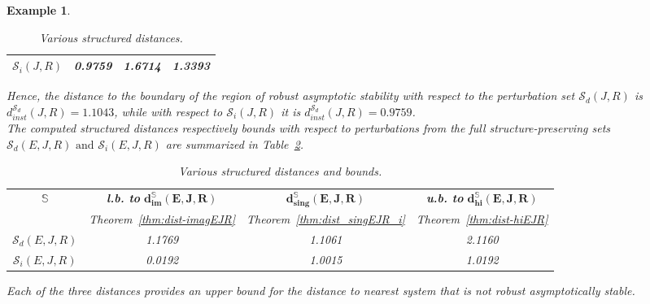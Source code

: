 \documentclass[11pt]{article}
\newtheorem{example}[theorem]{Example}
\begin{document}
\begin{example}
{\begin{table}[h!]
\begin{tabular}{cccc}
            $\mathcal S_i(J,R)$
            & 0.9759
            & 1.6714
            & 1.3393 \\
            \hline
        \end{tabular}
        \caption{Various structured distances.}
        \label{tab:example2}
    \end{table}
%
Hence, the distance to the boundary of the region of robust asymptotic stability with respect to the perturbation set $\mathcal S_d(J,R)$ is $d_{inst}^{\mathcal S_d}(J,R)=1.1043$, while with respect to $\mathcal S_i(J,R)$ it is $d_{inst}^{\mathcal S_d}(J,R)=0.9759$. \\

The computed  structured distances respectively bounds with respect to perturbations from the full structure-preserving sets $\mathcal S_d(E,J,R) \text{ and }\mathcal S_i(E,J,R)$ %
are summarized in Table~\ref{tab:example2a}.
    \begin{table}[h!]
        \centering
        \renewcommand{\arraystretch}{1.5}
        \begin{tabular}{cccc}
            \hline
            \textbf{$\mathbb  S$}
            & \textbf{l.b. to} $\mathbf{d_{im}^{\mathbb S}(E,J,R)}$
            & $\mathbf{d_{sing}^{\mathbb S}(E,J,R)}$
            & \textbf{u.b. to} $\mathbf{d_{hi}^{\mathbb S}(E,J,R)}$ \\

            & Theorem~\ref{thm:dist-imagEJR}
            & Theorem~\ref{thm:dist_singEJR_i}
            & Theorem~\ref{thm:dist-hiEJR}\\
            \hline

            $\mathcal S_d(E,J,R)$
            & 1.1769
            & 1.1061
            & 2.1160 \\

            $\mathcal S_i(E,J,R)$
            & 0.0192
            & 1.0015
            & 1.0192 \\
            \hline
        \end{tabular}
        \caption{Various structured distances and bounds.}
        \label{tab:example2a}
    \end{table}
Each of the three distances
provides an upper bound for the distance to nearest system that is not robust asymptotically stable. }
\end{example}
\end{document}
